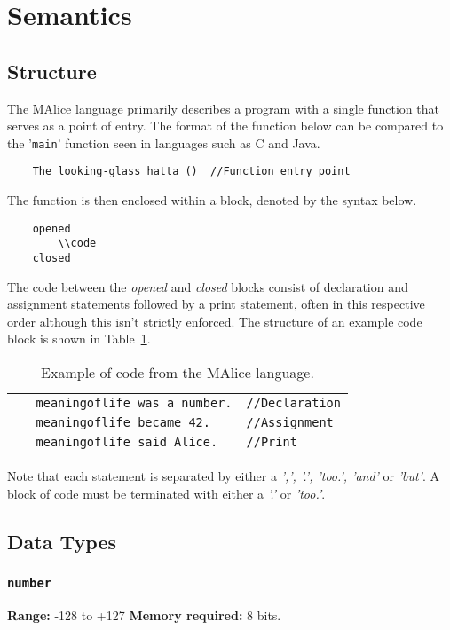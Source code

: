 \documentclass[a4wide, 10pt]{article}
\begin{document}
\section{Semantics}
\subsection{Structure}
The MAlice language primarily describes a program with a single function 
that serves as a point of entry. The format of the function below can be
compared to the '\texttt{main}' function seen in languages such as C and Java.

\begin{verbatim}
    The looking-glass hatta ()  //Function entry point
\end{verbatim}

The function is then enclosed within a block, denoted by the syntax below.
\begin{verbatim}
    opened
        \\code
    closed
\end{verbatim}

The code between the \emph{opened} and \emph{closed} blocks consist of 
declaration and assignment statements followed by a print statement, 
often in this respective order although this isn't strictly enforced. The 
structure of an example code block is shown in Table~\ref{tab:code}.

\begin{table}[h]
\begin{tabular}{l l}
\verb|   meaningoflife was a number.| & \verb|//Declaration| \\
\verb|   meaningoflife became 42.| & \verb|//Assignment| \\
\verb|   meaningoflife said Alice.| & \verb|//Print| \\
\end{tabular}
\caption{Example of code from the MAlice language.}
\label{tab:code}
\end{table}
  
Note that each statement is separated by either a \emph{',', '.', 'too.',
 'and'} or \emph{'but'}. A block of code must be terminated with either a 
 \emph{'.'} or \emph{'too.'}.

\subsection{Data Types}

\subsubsection{\texttt{number}}
\label{sec:number}
{\bf Range:} -128 to +127 {\bf Memory required:} 8 bits.
 
\end{document}
